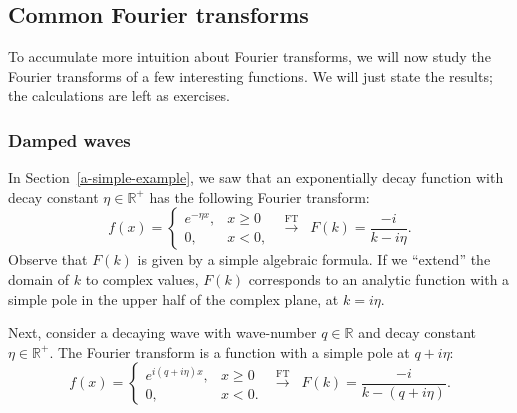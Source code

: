 \documentclass[10pt,a4paper]{article}
\begin{document}
\subsection{Common Fourier transforms}\label{common-fourier-transforms}

To accumulate more intuition about Fourier transforms, we will now study
the Fourier transforms of a few interesting functions. We will just
state the results; the calculations are left as exercises.

\subsubsection{Damped waves}\label{damped-waves}

In Section~\ref{a-simple-example}, we saw that an exponentially decay
function with decay constant $\eta \in \mathbb{R}^+$ has the following
Fourier transform:
\begin{equation}
f(x) = \left\{\begin{array}{cl}e^{-\eta x}, & x \ge 0 \\ 0, & x < 0,\end{array}\right. \;\;  \overset{\mathrm{FT}}{\longrightarrow} \;\; F(k) = \frac{-i}{k-i\eta}.
\end{equation}
Observe that $F(k)$ is given by a simple algebraic formula. If we
``extend'' the domain of $k$ to complex values, $F(k)$ corresponds to
an analytic function with a simple pole in the upper half of the
complex plane, at $k = i\eta$.

Next, consider a decaying wave with wave-number $q \in \mathbb{R}$ and
decay constant $\eta \in \mathbb{R}^+$. The Fourier transform is a
function with a simple pole at $q + i \eta$:
\begin{equation}
f(x) = \left\{\begin{array}{cl}e^{i (q + i\eta) x}, & x \ge 0 \\ 0, & x < 0.\end{array}\right. \;\;  \overset{\mathrm{FT}}{\longrightarrow} \;\; F(k) = \frac{-i}{k-(q + i\eta)}.
\end{equation}
    
\end{document}
